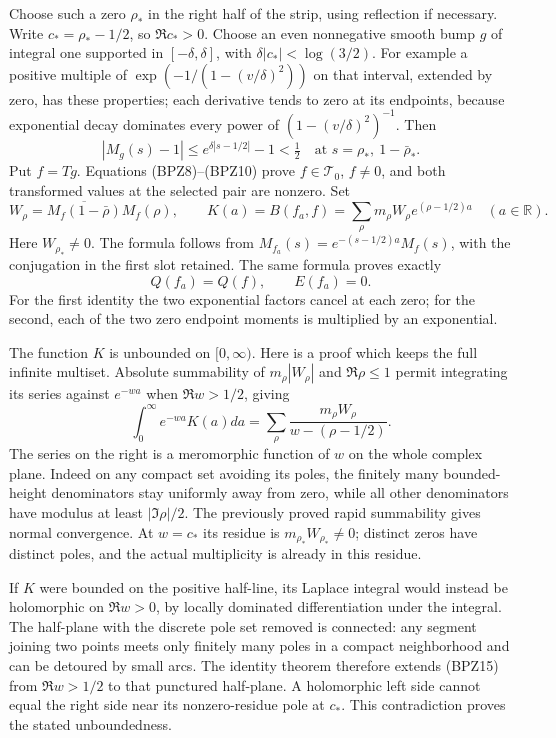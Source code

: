 Choose such a zero $\rho_*$ in the right half of the strip, using
reflection if necessary. Write $c_*=\rho_*-1/2$, so $\Re c_*>0$.
Choose an even nonnegative smooth bump $g$ of integral one supported in
$[-\delta,\delta]$, with
$\delta|c_*|<\log(3/2)$. For example a positive multiple of
$\exp(-1/(1-(v/\delta)^2))$ on that interval, extended by zero,
has these properties; each derivative tends to zero at its endpoints,
because exponential decay dominates every power of
$(1-(v/\delta)^2)^{-1}$. Then
\[
 |M_g(s)-1|\le e^{\delta|s-1/2|}-1<\tfrac12
 \quad\text{at }s=\rho_*,\ 1-\bar\rho_*.
\]
Put $f=Tg$. Equations (BPZ8)--(BPZ10) prove
$f\in\mathcal T_0$, $f\ne0$, and both transformed values at the
selected pair are nonzero. Set
\begin{equation}\tag{BPZ13}
 W_\rho=\overline{M_f(1-\bar\rho)}M_f(\rho),\qquad
 K(a)=B(f_a,f)=\sum_\rho m_\rho W_\rho
                    e^{(\rho-1/2)a}\quad(a\in\mathbb R).
\end{equation}
Here $W_{\rho_*}\ne0$. The formula follows from
$M_{f_a}(s)=e^{-(s-1/2)a}M_f(s)$, with the conjugation in the
first slot retained. The same formula proves exactly
\begin{equation}\tag{BPZ14}
 Q(f_a)=Q(f),\qquad E(f_a)=0.
\end{equation}
For the first identity the two exponential factors cancel at each
zero; for the second, each of the two zero endpoint moments is
multiplied by an exponential.

The function $K$ is unbounded on $[0,\infty)$. Here is a proof which
keeps the full infinite multiset. Absolute summability of $m_\rho
|W_\rho|$ and $\Re\rho\le1$ permit integrating its series against
$e^{-wa}$ when $\Re w>1/2$, giving
\begin{equation}\tag{BPZ15}
 \int_0^\infty e^{-wa}K(a)da
       =\sum_\rho\frac{m_\rho W_\rho}{w-(\rho-1/2)}.
\end{equation}
The series on the right is a meromorphic function of $w$ on the
whole complex plane. Indeed on any compact set avoiding its poles,
the finitely many bounded-height denominators stay uniformly away
from zero, while all other denominators have modulus at least
$|\Im\rho|/2$. The previously proved rapid summability gives normal
convergence. At $w=c_*$ its residue is
$m_{\rho_*}W_{\rho_*}\ne0$; distinct zeros have distinct poles, and
the actual multiplicity is already in this residue.

If $K$ were bounded on the positive half-line, its Laplace integral
would instead be holomorphic on $\Re w>0$, by locally dominated
differentiation under the integral. The half-plane with the discrete
pole set removed is connected: any segment joining two points meets
only finitely many poles in a compact neighborhood and can be
detoured by small arcs. The identity theorem therefore extends (BPZ15)
from $\Re w>1/2$ to that punctured half-plane. A holomorphic left
side cannot equal the right side near its nonzero-residue pole at
$c_*$. This contradiction proves the stated unboundedness.

